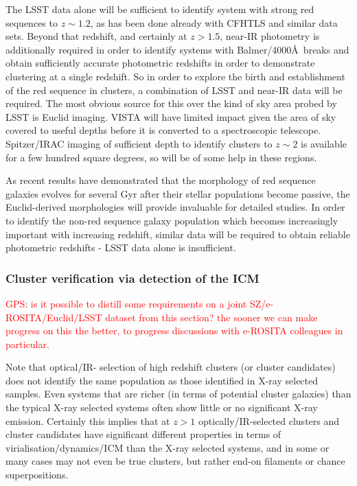 \documentclass[a4paper,11pt]{article}
\newcommand{\red}{\textcolor{red}}
\begin{document}
The LSST data alone will be sufficient to identify system with strong
red sequences to $z\sim 1.2$, as has been done already with CFHTLS and
similar data sets. Beyond that redshift, and certainly at $z>1.5$,
near-IR photometry is additionally required in order to identify
systems with Balmer/4000\AA\ breaks and obtain sufficiently accurate
photometric redshifts in order to demonstrate clustering at a single
redshift. So in order to explore the birth and establishment of the
red sequence in clusters, a combination of LSST and near-IR data will
be required. The most obvious source for this over the kind of sky
area probed by LSST is Euclid imaging. VISTA will have limited impact
given the area of sky covered to useful depths before it is converted
to a spectroscopic telescope.  Spitzer/IRAC imaging of sufficient
depth to identify clusters to $z\sim 2$ is available for a few hundred
square degrees, so will be of some help in these regions.

As recent results have demonstrated that the morphology of red
sequence galaxies evolves for several Gyr after their stellar
populations become passive, the Euclid-derived morphologies will
provide invaluable for detailed studies. In order to identify the
non-red sequence galaxy population which becomes increasingly
important with increasing redshift, similar data will be required to
obtain reliable photometric redshifts - LSST data alone is
insufficient.

\subsubsection*{Cluster verification via detection of the ICM}

\red{GPS: is it possible to distill some requirements on a joint
  SZ/e-ROSITA/Euclid/LSST dataset from this section?  the sooner we
  can make progress on this the better, to progress discussions with
  e-ROSITA colleagues in particular.}

Note that optical/IR- selection of high redshift clusters (or cluster
candidates) does not identify the same population as those identified
in X-ray selected samples. Even systems that are richer (in terms of
potential cluster galaxies) than the typical X-ray selected systems
often show little or no significant X-ray emission. Certainly this
implies that at $z>1$ optically/IR-selected clusters and cluster
candidates have significant different properties in terms of
virialisation/dynamics/ICM than the X-ray selected systems, and in
some or many cases may not even be true clusters, but rather end-on
filaments or chance superpositions.
\end{document}
